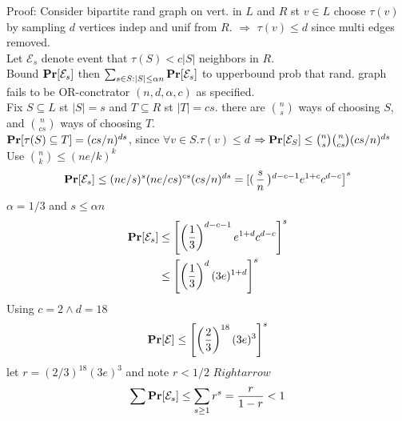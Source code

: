 \documentclass[a4paper]{article}
\def\Pr{\mbox{\textbf{Pr}}}
\begin{document}
Proof: Consider bipartite rand graph on vert. in \(L\) and \(R\) st \(v\in L\) choose \(\tau(v)\) by sampling \(d\) vertices indep and unif from \(R\). \(\Rightarrow\) \(\tau(v) \leq d\) since multi edges removed.\\
Let \(\mathcal{E}_s\) denote event that \(\tau(S) < c|S|\) neighbors in \(R\).\\
Bound \(\Pr[\mathcal{E}_s]\) then \(\sum_{s\in S: |S| \leq \alpha n} \Pr[\mathcal{E}_s]\) to upperbound prob that rand. graph fails to be OR-conctrator \((n,d,\alpha,c)\) as specified.\\
Fix \(S\subseteq L\) st \(|S|=s\) and \(T\subseteq R\) st \(|T|=cs\). there are \({n \choose s}\) ways of choosing \(S\), and \({n \choose cs}\) ways of choosing \(T\).\\
\(\Pr[\tau(S) \subseteq T] = (cs/n)^{ds}\), since \(\forall v\in S.\tau(v) \leq d\) \(\Rightarrow \Pr[\mathcal{E}_S] \leq {n \choose s} {n \choose cs} (cs/n)^{ds}\)\\
Use \({n \choose k} \leq (ne/k)^k\)
\[\Pr[\mathcal{E}_s]\leq (ne/s)^s(ne/cs)^{cs}(cs/n)^{ds}  = \left[\right(\frac{s}{n}\left)^{d-c-1} e^{1+c} c^{d-c}\right]^s\]
\(\alpha = 1/3\) and \(s \leq \alpha n\)\\
\begin{align*}
\Pr[\mathcal{E}_s] &\leq \left[\left(\frac{1}{3}\right)^{d-c-1} e^{1+d} c^{d-c}\right]^s\\
                   &\leq \left[\left(\frac{1}{3}\right)^{d} (3e)^{1+d}\right]^s
\end{align*}
Using \(c=2 \wedge d=18\)
\[\Pr[\mathcal{E}] \leq \left[\left(\frac{2}{3}\right)^{18}(3e)^3\right]^s\]
let \(r=(2/3)^{18}(3e)^3\) and note \(r < 1/2\) \(Rightarrow\)
\[\sum \Pr[\mathcal{E}_s] \leq \sum_{s\geq 1} r^s = \frac{r}{1-r} < 1\]
\end{document}
